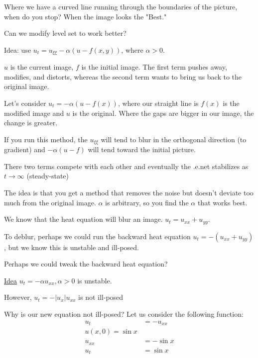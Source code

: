 

Where we have a curved line running through the boundaries of the picture, when do you stop? When the image looks the "Best."

Can we modify level set to work better?

Idea: use $u_t = u_{\xi\xi} - \alpha(u - f(x, y))$, where $\alpha > 0$.

$u$ is the current image, $f$ is the initial image. The first term pushes away, modifies, and distorts, whereas the second term wants to bring us back to the original image.

Let's consider $u_t = - \alpha(u - f(x))$, where our straight line is $f(x)$ is the modified image and $u$ is the original. Where the gaps are bigger in our image, the change is greater.

If you run this method, the $u_{\xi\xi}$ will tend to blur in the orthogonal direction (to gradient) and $-\alpha(u - f)$ will tend toward the initial picture.

There two terms compete with each other and eventually the .e.net stabilizes as $t \to \infty$ (steady-state)

The idea is that you get a method that removes the noise but doesn't deviate too much from the original image. $\alpha$ is arbitrary, so you find the $\alpha$ that works best.


We know that the heat equation will blur an image. $u_t = u_{xx} + u_{yy}$.

To deblur, perhaps we could run the backward heat equation $u_t = -(u_{xx} + u_{yy})$, but we know this is unstable and ill-posed.

Perhaps we could tweak the backward heat equation?

\underline{Idea} $u_t = -\alpha u_{xx}, \alpha > 0$ is unstable.

However, $u_t = -|u_x| u_{xx}$ is not ill-posed

Why is our new equation not ill-posed? Let us consider the following function:
%
\begin{align*}
  u_t & = -u_{xx}\\
  u(x, 0) = \sin x\\
  u_{xx} & = -\sin x\\
  u_t & = \sin x
\end{align*}

